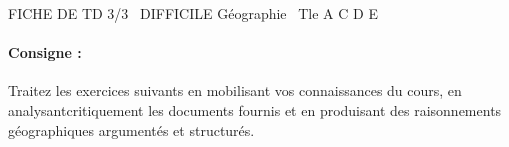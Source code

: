 \documentclass[11pt]{article}
\begin{document}
\begin{tcolorbox}[enhanced,colback=popink,colframe=popink,arc=10pt,boxrule=0pt,left=12pt,right=12pt,top=9pt,bottom=9pt]
{\color{white}\popxbold\small FICHE DE TD 3/3 \textbullet\ DIFFICILE \hfill Géographie \textbullet\ Tle A C D E\par}
\end{tcolorbox}
\vspace{4pt}
\paragraph{Consigne :} Traitez les exercices suivants en mobilisant vos connaissances du cours, en analysantcritiquement les documents fournis et en produisant des raisonnements géographiques argumentés et structurés.
\end{document}
